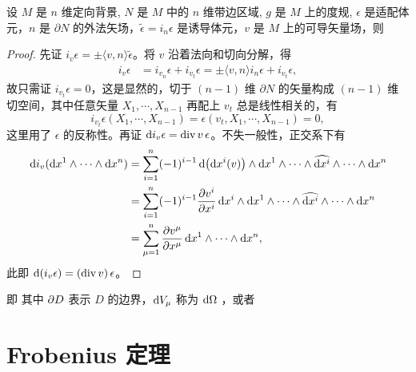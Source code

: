 \begin{theorem}[Gauss]
    设 $M$ 是 $n$ 维定向背景, $N$ 是 $M$ 中的 $n$ 维带边区域, $g$ 是 $M$ 上的度规, $\epsilon$ 是适配体元，$n$ 是 $\partial N$ 的外法矢场，$\tilde\epsilon=i_n \epsilon$ 是诱导体元，$v$ 是 $M$ 上的可导矢量场，则
\end{theorem}
\begin{proof}
    先证 $i_v\epsilon=\pm\langle v,n\rangle \tilde\epsilon$。将 $v$ 沿着法向和切向分解，得
    \begin{align*}
        i_v\epsilon&=i_{v_n}\epsilon+i_{v_t}\epsilon=\pm\langle v,n\rangle i_{n}\epsilon+i_{v_t}\epsilon,
    \end{align*}
    故只需证 $i_{v_t}\epsilon=0$，这是显然的，切于 $(n-1)$ 维 $\partial N$ 的矢量构成 $(n-1)$ 维切空间，其中任意矢量 $X_1,\cdots,X_{n-1}$ 再配上 $v_t$ 总是线性相关的，有
    \[
    i_{v_t}\epsilon(X_1,\cdots,X_{n-1})=\epsilon(v_t,X_1,\cdots,X_{n-1})=0,
    \]
    这里用了 $\epsilon$ 的反称性。再证 $\dd i_v\epsilon=\operatorname{div} v\,\epsilon$。不失一般性，正交系下有
    \begin{align*}
        \dd i_v(\dd x^1\wedge\cdots\wedge\dd x^n)&= \sum_{i=1}^n (-1)^{i-1} \dd(\dd x^i(v))\wedge\dd x^1 \wedge \cdots \wedge \widehat{\dd x^i}\wedge \cdots \wedge \dd x^n\\
        &=\sum_{i=1}^n (-1)^{i-1} \pdv{v^i}{x^i}\,\dd x^i\wedge\dd x^1 \wedge \cdots \wedge \widehat{\dd x^i}\wedge \cdots \wedge \dd x^n\\
        &=\sum_{\mu=1}^n\pdv{v^\mu}{x^\mu}\,\dd x^1\wedge\cdots\wedge\dd x^n,
    \end{align*}
    此即 $\dd(i_v\epsilon)=(\operatorname{div} v)\,\epsilon$。
\end{proof}


即
其中 $\partial D$ 表示 $D$ 的边界，$\dd V_\mu$ 称为 $\dd{\Omega}$ ，或者


\section{Frobenius 定理}\label{sec:Frobenius}

